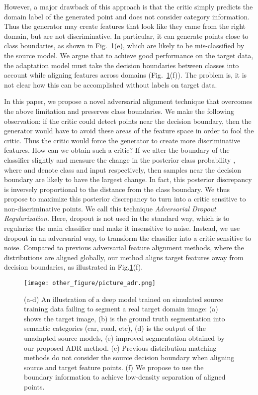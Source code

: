 \documentclass{article} \usepackage{iclr2018_conference,times}
\begin{document}
However, a major drawback of this approach is that the critic simply predicts the domain label of the generated point and does not consider category information. Thus the generator may create features that look like they came from the right domain, but are not discriminative. In particular, it can generate points close to class boundaries, as shown in Fig.~\ref{fig:intro}(e), which are likely to be mis-classified by the source model. We argue that to achieve good performance on the target data, the adaptation model must take the decision boundaries between classes into account while aligning features across domains (Fig.~\ref{fig:intro}(f)). The problem is, it is not clear how this can be accomplished without labels on target data.

In this paper, we propose a novel adversarial alignment technique that overcomes the above limitation and preserves class boundaries.
We make the following observation: if the critic could detect points near the decision boundary, then the generator would have to avoid these areas of the feature space in order to fool the critic. Thus the critic would force the generator to create more discriminative features. How can we obtain such a critic? If we alter the boundary of the classifier  slightly and measure the change in the posterior class probability , where  and  denote class and input respectively, then samples near the decision boundary are likely to have the largest change. In fact, this posterior discrepancy is inversely proportional to the distance from the class boundary. We thus propose to maximize this posterior discrepancy to turn  into a critic sensitive to non-discriminative points. We call this technique \textit{Adversarial Dropout Regularization}. Here, dropout is not used in the standard way, which is to regularize the main classifier and make it insensitive to noise. Instead, we use dropout in an adversarial way, to transform the classifier into a critic sensitive to noise. Compared to previous adversarial feature alignment methods, where the distributions  are aligned globally, our method aligns target features away from decision boundaries, as illustrated in Fig.\ref{fig:intro}(f). 
\begin{figure}[t]
  \begin{center}
  \texttt{[image: other\_figure/picture\_adr.png]}
  \end{center}
 \vspace{-0.1in}
  \caption{{\small (a-d) An illustration of a deep model trained on simulated source training data failing to segment a real target domain image: (a) shows the target image, (b) is the ground truth segmentation into semantic categories (car, road, etc), (d) is the output of the unadapted source models, (e) improved segmentation obtained by our proposed ADR method. (e) Previous distribution matching methods do not consider the source decision boundary when aligning source and target feature points. (f) We propose to use the boundary information to achieve low-density separation of aligned points.}}
  \label{fig:intro}
  \end{figure}
\end{document}

